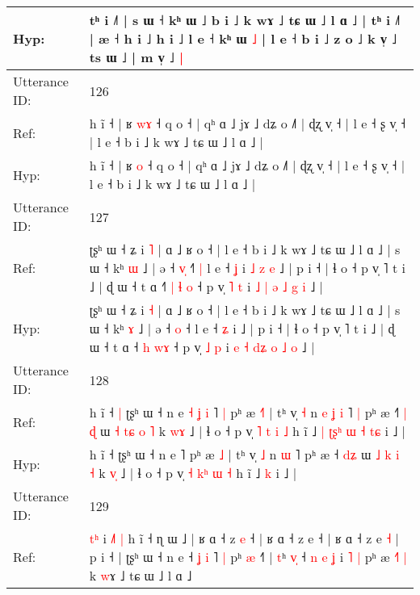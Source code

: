 \documentclass[10pt]{article}
\DeclareRobustCommand{\hl}[1]{{\textcolor{red}{#1}}}
\begin{document}
\begin{longtable}{ll}
 \\
Hyp: & tʰ i ˩˥ | s ɯ ˧ kʰ ɯ ˩ b i ˩ k wɤ ˩ tɕ ɯ ˩ l ɑ ˩ | tʰ i ˩˥ | æ ˧ h i ˩ h i ˩\hl{}\hl{} l e ˧ kʰ ɯ \hl{}\hl{˩} | l e ˧ b i ˩ z o ˩ k v̩ ˩ ts ɯ ˩ | m v̩ ˩\hl{ }\hl{|}
 \\
\midrule
Utterance ID: & 126 \\
Ref: & h ĩ ˧ | ʁ \hl{w}\hl{ɤ} ˧ q o ˧ | qʰ ɑ ˩ jɤ ˩ dʑ o ˩˥ | ɖʐ v̩ ˧ | l e ˧ ʂ v̩ ˧ | l e ˧ b i ˩ k wɤ ˩ tɕ ɯ ˩ l ɑ ˩ |
 \\
Hyp: & h ĩ ˧ | ʁ \hl{}\hl{o} ˧ q o ˧ | qʰ ɑ ˩ jɤ ˩ dʑ o ˩˥ | ɖʐ v̩ ˧ | l e ˧ ʂ v̩ ˧ | l e ˧ b i ˩ k wɤ ˩ tɕ ɯ ˩ l ɑ ˩ |
 \\
\midrule
Utterance ID: & 127 \\
Ref: & ʈʂʰ ɯ ˧ ʑ i \hl{˥} | ɑ ˩ ʁ o ˧ | l e ˧ b i ˩ k wɤ ˩ tɕ ɯ ˩ l ɑ ˩ | s ɯ ˧ kʰ \hl{ɯ} ˩ | ə ˧ \hl{v}\hl{̩} ˧\hl{˥}\hl{ }\hl{|} l e ˧ \hl{ʝ} i\hl{ }\hl{˩}\hl{ }\hl{z}\hl{ }\hl{e} ˩ | p i ˧ | ɬ o ˧ p v̩ ˥ t i ˩ | ɖ ɯ ˧ t ɑ ˧\hl{˥} \hl{|} \hl{ɬ}\hl{ }\hl{o} ˧ p v̩ \hl{˥} \hl{t} i \hl{˩} \hl{|} \hl{}\hl{ə} \hl{˩} \hl{g} \hl{i} ˩ |
 \\
Hyp: & ʈʂʰ ɯ ˧ ʑ i \hl{˧} | ɑ ˩ ʁ o ˧ | l e ˧ b i ˩ k wɤ ˩ tɕ ɯ ˩ l ɑ ˩ | s ɯ ˧ kʰ \hl{ɤ} ˩ | ə ˧ \hl{}\hl{o} ˧\hl{}\hl{}\hl{} l e ˧ \hl{ʑ} i\hl{}\hl{}\hl{}\hl{}\hl{}\hl{} ˩ | p i ˧ | ɬ o ˧ p v̩ ˥ t i ˩ | ɖ ɯ ˧ t ɑ ˧\hl{} \hl{h} \hl{}\hl{w}\hl{ɤ} ˧ p v̩ \hl{˩} \hl{p} i \hl{e} \hl{˧} \hl{d}\hl{ʑ} \hl{o} \hl{˩} \hl{o} ˩ |
 \\
\midrule
Utterance ID: & 128 \\
Ref: & h ĩ ˧\hl{ }\hl{|} ʈʂʰ ɯ ˧ n e\hl{ }\hl{˧}\hl{ }\hl{ʝ}\hl{ }\hl{i} ˥\hl{ }\hl{|} pʰ æ \hl{˧}\hl{˥} | tʰ v̩ \hl{˧} n\hl{ }\hl{e}\hl{ }\hl{ʝ} \hl{i} ˥\hl{ }\hl{|} pʰ æ ˧\hl{˥} \hl{|}\hl{ }\hl{ɖ} ɯ \hl{˧} \hl{t}\hl{ɕ} \hl{o} \hl{˥} k \hl{w}\hl{ɤ} ˩ | ɬ o ˧ p v̩ \hl{˥} \hl{}\hl{t} \hl{i} \hl{˩} h ĩ ˩\hl{ }\hl{|}\hl{ }\hl{ʈ}\hl{ʂ}\hl{ʰ}\hl{ }\hl{ɯ}\hl{ }\hl{˧} \hl{t}\hl{ɕ} i ˩ |
 \\
Hyp: & h ĩ ˧\hl{}\hl{} ʈʂʰ ɯ ˧ n e\hl{}\hl{}\hl{}\hl{}\hl{}\hl{} ˥\hl{}\hl{} pʰ æ \hl{}\hl{˩} | tʰ v̩ \hl{˩} n\hl{}\hl{}\hl{}\hl{} \hl{ɯ} ˥\hl{}\hl{} pʰ æ ˧\hl{} \hl{}\hl{d}\hl{ʑ} ɯ \hl{˩} \hl{}\hl{k} \hl{i} \hl{˧} k \hl{v}\hl{̩} ˩ | ɬ o ˧ p v̩ \hl{˧} \hl{k}\hl{ʰ} \hl{ɯ} \hl{˧} h ĩ ˩\hl{}\hl{}\hl{}\hl{}\hl{}\hl{}\hl{}\hl{}\hl{}\hl{} \hl{}\hl{k} i ˩ |
 \\
\midrule
Utterance ID: & 129 \\
Ref: & \hl{t}\hl{ʰ} i\hl{ }\hl{˩}\hl{˥}\hl{ }\hl{|} h ĩ ˧ ɳ ɯ ˩ | ʁ ɑ ˧ \hl{}z \hl{e} ˧ | ʁ ɑ ˧ \hl{}z e ˧ | ʁ ɑ ˧ z\hl{}\hl{} e \hl{˧} | p i ˧ | ʈʂʰ ɯ ˧ n e ˧\hl{ }\hl{ʝ}\hl{ }\hl{i} ˥\hl{ }\hl{|} pʰ \hl{æ} ˧\hl{˥} | \hl{}\hl{t}ʰ \hl{v}\hl{̩} ˧\hl{ }\hl{n}\hl{ }\hl{e} \hl{ʝ} i\hl{ }\hl{˥} \hl{|} pʰ æ\hl{ }\hl{˧}\hl{˥} \hl{|} k \hl{w}ɤ ˩ tɕ ɯ ˩ l ɑ ˩\hl{}\hl{}

\end{longtable}
\end{document}
